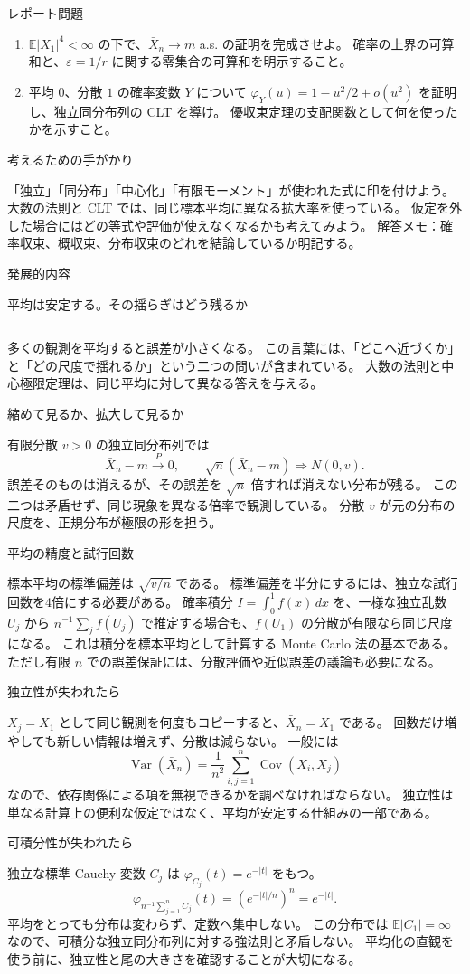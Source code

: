 \documentclass[a4paper,10pt,pdflatex,ja=standard,jafont=ipaex-type1,
  magstyle=real,scale=1]{bxjsarticle}
\newcommand{\coursename}{確率論と統計学 I}
\newcommand{\topic}[1]{\par\vspace{5pt}
  {\large\sffamily\mdseries\color{accent}#1}\par\vspace{2pt}}
\newcommand{\columnheading}[1]{\par\vspace{5pt}
  {\fontsize{11pt}{15pt}\selectfont\sffamily\mdseries\color{accent}#1}\par\vspace{2pt}}
\newcommand{\columnstart}[1]{\clearpage
  \setlength{\parskip}{2.5pt}
  \fancyhead[L]{\small\color{ink}\coursename{}・発展的内容}
  {\small\sffamily\mdseries\color{accent}発展的内容}\par\vspace{4pt}
  {\Large\color{ink}#1}\par\vspace{2pt}
  {\color{accent}\rule{\linewidth}{0.7pt}}\par\vspace{4pt}}
\newcommand{\E}{\mathbb E}
\newcommand{\Var}{\operatorname{Var}}
\newcommand{\Cov}{\operatorname{Cov}}
\begin{document}
\topic{レポート問題}
\begin{enumerate}[label=\arabic*.]
\item $\E|X_1|^4<\infty$ の下で、$\bar X_n\to m$ a.s. の証明を完成させよ。
確率の上界の可算和と、$\varepsilon=1/r$ に関する零集合の可算和を明示すること。
\item 平均 $0$、分散 $1$ の確率変数 $Y$ について
$\varphi_Y(u)=1-u^2/2+o(u^2)$ を証明し、独立同分布列の CLT を導け。
優収束定理の支配関数として何を使ったかを示すこと。
\end{enumerate}

\topic{考えるための手がかり}
「独立」「同分布」「中心化」「有限モーメント」が使われた式に印を付けよう。
大数の法則と CLT では、同じ標本平均に異なる拡大率を使っている。
仮定を外した場合にはどの等式や評価が使えなくなるかも考えてみよう。
\vfill
{\small\color{muted}解答メモ：確率収束、概収束、分布収束のどれを結論しているか明記する。}

\columnstart{平均は安定する。その揺らぎはどう残るか}
多くの観測を平均すると誤差が小さくなる。
この言葉には、「どこへ近づくか」と「どの尺度で揺れるか」という二つの問いが含まれている。
大数の法則と中心極限定理は、同じ平均に対して異なる答えを与える。

\columnheading{縮めて見るか、拡大して見るか}
有限分散 $v>0$ の独立同分布列では
$$\bar X_n-m\xrightarrow{P}0,\qquad
 \sqrt n(\bar X_n-m)\Rightarrow N(0,v).$$
誤差そのものは消えるが、その誤差を $\sqrt n$ 倍すれば消えない分布が残る。
この二つは矛盾せず、同じ現象を異なる倍率で観測している。
分散 $v$ が元の分布の尺度を、正規分布が極限の形を担う。

\columnheading{平均の精度と試行回数}
標本平均の標準偏差は $\sqrt{v/n}$ である。
標準偏差を半分にするには、独立な試行回数を4倍にする必要がある。
確率積分 $I=\int_0^1 f(x)\,dx$ を、一様な独立乱数 $U_j$ から
$n^{-1}\sum_jf(U_j)$ で推定する場合も、$f(U_1)$ の分散が有限なら同じ尺度になる。
これは積分を標本平均として計算する Monte Carlo 法の基本である。
ただし有限 $n$ での誤差保証には、分散評価や近似誤差の議論も必要になる。

\columnheading{独立性が失われたら}
$X_j=X_1$ として同じ観測を何度もコピーすると、$\bar X_n=X_1$ である。
回数だけ増やしても新しい情報は増えず、分散は減らない。
一般には
$$\Var(\bar X_n)=\frac1{n^2}\sum_{i,j=1}^n\Cov(X_i,X_j)$$
なので、依存関係による項を無視できるかを調べなければならない。
独立性は単なる計算上の便利な仮定ではなく、平均が安定する仕組みの一部である。

\columnheading{可積分性が失われたら}
独立な標準 Cauchy 変数 $C_j$ は $\varphi_{C_j}(t)=e^{-|t|}$ をもつ。
$$\varphi_{n^{-1}\sum_{j=1}^nC_j}(t)
 =\left(e^{-|t|/n}\right)^n=e^{-|t|}.$$
平均をとっても分布は変わらず、定数へ集中しない。
この分布では $\E|C_1|=\infty$ なので、可積分な独立同分布列に対する強法則と矛盾しない。
平均化の直観を使う前に、独立性と尾の大きさを確認することが大切になる。

\label{lastpage}
\end{document}
